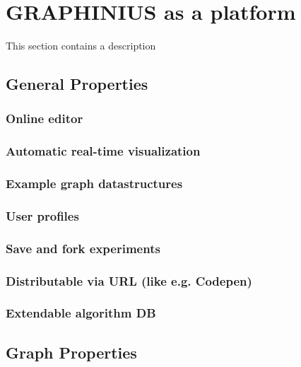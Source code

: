 \chapter{GRAPHINIUS as a platform}
\label{ch:graphinius_platform}

This section contains a description


\section{General Properties}
\label{sect:general_properties}
	
	\subsection{Online editor}
	\label{ssect:online_editor}
	
	\subsection{Automatic real-time visualization}
	\label{ssect:realtime_vis}
	
	\subsection{Example graph datastructures}
	\label{ssect:pre_settings}
	
	\subsection{User profiles}
	\label{ssect:user_profiles}
	
	\subsection{Save and fork experiments}
	\label{ssect:save_fork}
	
	\subsection{Distributable via URL (like e.g. Codepen)}
	\label{ssect:distribute_url}
	
	\subsection{Extendable algorithm DB}
	\label{ssect:ext_algo_db}



\section{Graph Properties}
\label{sect:graph_properties}

